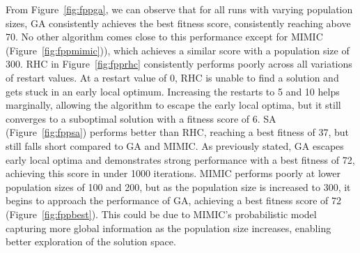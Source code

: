 From Figure~\ref{fig:fppga}, we can observe that for all runs with varying population sizes, GA consistently achieves the best fitness score, consistently reaching above 70. No other algorithm comes close to this performance except for MIMIC (Figure~\ref{fig:fppmimic})), which achieves a similar score with a population size of 300. RHC in Figure~\ref{fig:fpprhc} consistently performs poorly across all variations of restart values. At a restart value of 0, RHC is unable to find a solution and gets stuck in an early local optimum. Increasing the restarts to 5 and 10 helps marginally, allowing the algorithm to escape the early local optima, but it still converges to a suboptimal solution with a fitness score of 6. SA (Figure~\ref{fig:fppsa}) performs better than RHC, reaching a best fitness of 37, but still falls short compared to GA and MIMIC. As previously stated, GA escapes early local optima and demonstrates strong performance with a best fitness of 72, achieving this score in under 1000 iterations. MIMIC performs poorly at lower population sizes of 100 and 200, but as the population size is increased to 300, it begins to approach the performance of GA, achieving a best fitness score of 72 (Figure~\ref{fig:fppbest}). This could be due to MIMIC's probabilistic model capturing more global information as the population size increases, enabling better exploration of the solution space.

